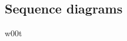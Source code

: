 \documentclass[Main]{subfiles}
\begin{document}
\subsection{Sequence diagrams}

w00t
\end{document}
